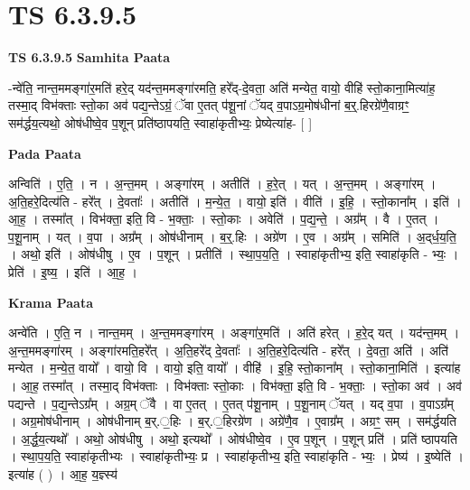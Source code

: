 \documentclass[17pt]{extarticle}
\begin{document}
\section{ TS 6.3.9.5 }

\textbf{TS 6.3.9.5 } \newline
\textbf{Samhita Paata} \newline

-न्वे॑ति॒ नान्त॒ममङ्गा॑र॒मति॑ हरे॒द् यद॑न्त॒ममङ्गा॑रमति॒ हरे᳚द्-दे॒वता॒ अति॑ मन्येत॒ वायो॒ वीहि॑ स्तो॒काना॒मित्या॑ह॒ तस्मा॒द् विभ॑क्ताः स्तो॒का अव॑ पद्य॒न्तेऽग्रं॒ ॅवा ए॒तत् प॑शू॒नां ॅयद् व॒पाऽग्र॒मोष॑धीनां ब॒र्॒.हिरग्रे॑णै॒वाग्रꣳ॒॒ सम॑र्द्धय॒त्यथो॒ ओष॑धीष्वे॒व प॒शून् प्रति॑ष्ठापयति॒ स्वाहा॑कृतीभ्यः॒ प्रेष्येत्या॑ह- [  ] \newline

\textbf{Pada Paata} \newline

अन्विति॑ । ए॒ति॒ । न । अ॒न्त॒मम् । अङ्गा॑रम् । अतीति॑ । ह॒रे॒त् । यत् । अ॒न्त॒मम् । अङ्गा॑रम् । अ॒ति॒हरे॒दित्य॑ति - हरे᳚त् । दे॒वताः᳚ । अतीति॑ । म॒न्ये॒त॒ । वायो॒ इति॑ । वीति॑ । इ॒हि॒ । स्तो॒काना᳚म् । इति॑ । आ॒ह॒ । तस्मा᳚त् । विभ॑क्ता॒ इति॒ वि - भ॒क्ताः॒ । स्तो॒काः । अवेति॑ । प॒द्य॒न्ते॒ । अग्र᳚म् । वै । ए॒तत् । प॒शू॒नाम् । यत् । व॒पा । अग्र᳚म् । ओष॑धीनाम् । ब॒र्॒.हिः । अग्रे॑ण । ए॒व । अग्र᳚म् । समिति॑ । अ॒द्‌र्ध॒य॒ति॒ । अथो॒ इति॑ । ओष॑धीषु । ए॒व । प॒शून् । प्रतीति॑ । स्था॒प॒य॒ति॒ । स्वाहा॑कृतीभ्य॒ इति॒ स्वाहा॑कृति - भ्यः॒ । प्रेति॑ । इ॒ष्य॒ । इति॑ । आ॒ह॒ ।  \newline


\textbf{Krama Paata} \newline

अन्वे॑ति । ए॒ति॒ न । नान्त॒मम् । अ॒न्त॒ममङ्‍गा॑रम् । अङ्‍गा॑र॒मति॑ । अति॑ हरेत् । ह॒रे॒द् यत् । यद॑न्त॒मम् । अ॒न्त॒ममङ्‍गा॑रम् । अङ्‍गा॑रमति॒हरे᳚त् । अ॒ति॒हरे᳚द् दे॒वताः᳚ । अ॒ति॒हरे॒दित्य॑ति - हरे᳚त् । दे॒वता॒ अति॑ । अति॑ मन्येत । म॒न्ये॒त॒ वायो᳚ । वायो॒ वि । वायो॒ इति॒ वायो᳚ । वीहि॑ । इ॒हि॒ स्तो॒काना᳚म् । स्तो॒काना॒मिति॑ । इत्या॑ह । आ॒ह॒ तस्मा᳚त् । तस्मा॒द् विभ॑क्ताः । विभ॑क्ताः स्तो॒काः । विभ॑क्ता॒ इति॒ वि - भ॒क्ताः॒ । स्तो॒का अव॑ । अव॑ पद्यन्ते । प॒द्य॒न्तेऽग्र᳚म् । अग्र॒म् ॅवै । वा ए॒तत् । ए॒तत् प॑शू॒नाम् । प॒शू॒नाम् ॅयत् । यद् व॒पा । व॒पाऽग्र᳚म् । अग्र॒मोष॑धीनाम् । ओष॑धीनाम् ब॒र्.॒हिः । ब॒र्.॒हिरग्रे॑ण । अग्रे॑णै॒व । ए॒वाग्र᳚म् । अग्रꣳ॒॒ सम् । सम॑र्द्धयति । अ॒र्द्ध॒य॒त्यथो᳚ । अथो॒ ओष॑धीषु । अथो॒ इत्यथो᳚ । ओष॑धीष्वे॒व । ए॒व प॒शून् । प॒शून् प्रति॑ । प्रति॑ ष्ठापयति । स्था॒प॒य॒ति॒ स्वाहा॑कृतीभ्यः । स्वाहा॑कृतीभ्यः॒ प्र । स्वाहा॑कृतीभ्य॒ इति॒ स्वाहा॑कृति - भ्यः॒ । प्रेष्य॑ । इ॒ष्येति॑ । इत्या॑ह ( ) । आ॒ह॒ य॒ज्ञ्स्य॑ \newline
\end{document}
